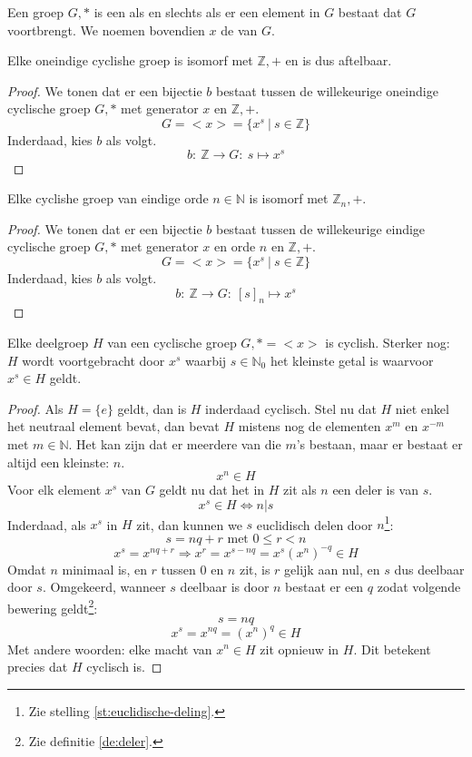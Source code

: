 \documentclass[main.tex]{subfiles}
\begin{document}
\begin{de}
  \label{de:cyclische-groep}
  Een groep $G,*$ is een  als en slechts als er een element in $G$ bestaat dat $G$ voortbrengt.
  We noemen bovendien $x$ de  van $G$.
\end{de}

\begin{ei}
  Elke oneindige cyclishe groep is isomorf met $\mathbb{Z},+$ en is dus aftelbaar.

  \begin{proof}
    We tonen dat er een bijectie $b$ bestaat tussen de willekeurige oneindige cyclische groep $G,*$ met generator $x$ en $\mathbb{Z},+$.
    \[ G = <x> = \{ x^{s}\ |\ s \in \mathbb{Z} \} \]
    Inderdaad, kies $b$ als volgt.
    \[ b:\ \mathbb{Z} \rightarrow G:\ s \mapsto x^{s} \]
  \end{proof}
\end{ei}

\begin{ei}
  Elke cyclishe groep van eindige orde $n \in \mathbb{N}$ is isomorf met $\mathbb{Z}_{n},+$.

  \begin{proof}
    We tonen dat er een bijectie $b$ bestaat tussen de willekeurige eindige cyclische groep $G,*$ met generator $x$ en orde $n$ en $\mathbb{Z},+$.
    \[ G = <x> = \{ x^{s}\ |\ s \in \mathbb{Z} \} \]
    Inderdaad, kies $b$ als volgt.
    \[ b:\ \mathbb{Z} \rightarrow G:\ [s]_{n} \mapsto x^{s} \]
  \end{proof}
\end{ei}

\begin{st}
  \label{st:deelgroep-van-cyclische-groep-is-cyclisch}
  Elke deelgroep $H$ van een cyclische groep $G,* = <x>$ is cyclish.
  Sterker nog: $H$ wordt voortgebracht door $x^{s}$ waarbij $s \in \mathbb{N}_{0 }$ het kleinste getal is waarvoor $x^{s} \in H$ geldt. 

  \begin{proof}
    Als $H = \{e\}$ geldt, dan is $H$ inderdaad cyclisch.
    Stel nu dat $H$ niet enkel het neutraal element bevat, dan bevat $H$ mistens nog de elementen $x^{m}$ en $x^{-m}$ met $m \in \mathbb{N}$.
    Het kan zijn dat er meerdere van die $m$'s bestaan, maar er bestaat er altijd een kleinste: $n$.
    \[ x^{n} \in H \]
    Voor elk element $x^{s}$ van $G$ geldt nu dat het in $H$ zit als $n$ een deler is van $s$.
    \[ x^{s} \in H \Leftrightarrow n|s \]
    Inderdaad, als $x^{s}$ in $H$ zit, dan kunnen we $s$ euclidisch delen door $n$\footnote{Zie stelling \ref{st:euclidische-deling}.}:
    \[ s = nq + r \text{ met } 0 \le r < n \]
    \[ x^{s} = x^{nq + r} \Rightarrow x^{r} = x^{s-nq} = x^{s}(x^{n})^{-q} \in H \]
    Omdat $n$ minimaal is, en $r$ tussen $0$ en $n$ zit, is $r$ gelijk aan nul, en $s$ dus deelbaar door $s$.
    Omgekeerd, wanneer $s$ deelbaar is door $n$ bestaat er een $q$ zodat volgende bewering geldt\footnote{Zie definitie \ref{de:deler}.}:
    \[ s = nq \]
    \[ x^{s} = x^{nq} = (x^{n})^{q} \in H \]
    Met andere woorden: elke macht van $x^{n} \in H$ zit opnieuw in $H$. Dit betekent precies dat $H$ cyclisch is.
  \end{proof}
\end{st}
\end{document}
